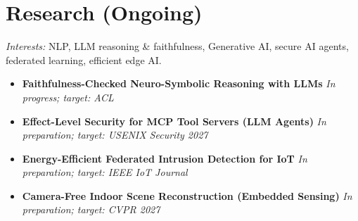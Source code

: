 \documentclass[10pt, a4paper]{article}
\begin{document}
\section{Research (Ongoing)}
\textit{Interests:} NLP, LLM reasoning \& faithfulness, Generative AI, secure AI
agents, federated learning, efficient edge AI.
\begin{itemize}
    \item \textbf{Faithfulness-Checked Neuro-Symbolic Reasoning with LLMs}
    \hfill \textit{In progress; target: ACL}
    \item \textbf{Effect-Level Security for MCP Tool Servers (LLM Agents)}
    \hfill \textit{In preparation; target: USENIX Security 2027}
    \item \textbf{Energy-Efficient Federated Intrusion Detection for IoT}
    \hfill \textit{In preparation; target: IEEE IoT Journal}
    \item \textbf{Camera-Free Indoor Scene Reconstruction (Embedded Sensing)}
    \hfill \textit{In preparation; target: CVPR 2027}
\end{itemize}

\end{document}
